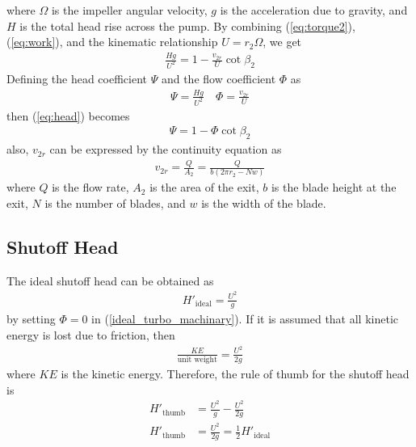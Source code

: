 where $\Omega$ is the impeller angular velocity, $g$ is the acceleration due to gravity, and $H$ is the total head rise across the pump. By combining (\ref{eq:torque2}), (\ref{eq:work}), and the kinematic relationship $U = r_2 \Omega$, we get
\begin{align}
    \frac{Hg}{U^2} = 1 - \frac{v_{2r}}{U} \cot{\beta_2} \label{eq:head}
\end{align}
Defining the head coefficient $\Psi$ and the flow coefficient $\Phi$ as
\begin{align}
    \Psi = \frac{Hg}{U^2} \quad \Phi = \frac{v_{2r}}{U} \label{eq:coefficients}
\end{align}
then (\ref{eq:head}) becomes
\begin{align}
    \Psi = 1 - \Phi \cot{\beta_2} \label{ideal_turbo_machinary}
\end{align}
also, $v_{2r}$ can be expressed by the continuity equation as 
\begin{align}
    v_{2r} = \frac{Q}{A_2} = \frac{Q}{b(2\pi r_2 - N w)} \label{eq:v2r}
\end{align}
where $Q$ is the flow rate, $A_2$ is the area of the exit, $b$ is the blade height at the exit, $N$ is the number of blades, and $w$ is the width of the blade. 

\subsection{Shutoff Head}
The ideal shutoff head can be obtained as 
\begin{align}
    H'_{\text{ideal}} = \frac{U^2}{g} \label{eq:ideal_shutoff_head}
\end{align}
by setting $\Phi = 0$ in (\ref{ideal_turbo_machinary}). If it is assumed that all kinetic energy is lost due to friction, then 
\begin{align*}
    \frac{KE}{\text{unit weight}} = \frac{U^2}{2g}
\end{align*}
where $KE$ is the kinetic energy. Therefore, the rule of thumb for the shutoff head is
\begin{align}
    H'_{\text{thumb}} &= \frac{U^2}{g} - \frac{U^2}{2g} \nonumber \\
    H'_{\text{thumb}} &= \frac{U^2}{2g} = \frac{1}{2} H'_{\text{ideal}} \label{eq:thumb_head}
\end{align}


